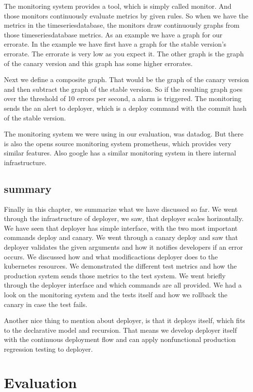 The monitoring system provides a tool, which is simply called monitor. And those monitors
continuously evaluate metrics by given rules. So when we have the metrics in the
timeseriesdatabase, the monitors draw continuously graphs from those timeseriesdatabase
metrics. As an example we have a graph for our errorate. In the example we have first have
a graph for the stable version's errorate. The errorate is very low as you expect it. The
other graph is the graph of the canary version and this graph has some higher errorates.

Next we define a composite graph. That would be the graph of the canary version and then
subtract the graph of the stable version. So if the resulting graph goes over the
threshold of 10 errors per second, a alarm is triggered. The monitoring sends the an alert
to deployer, which is a deploy command with the commit hash of the stable version.

The monitoring system we were using in our evaluation, was datadog. But there is also the
opens source monitoring system prometheus, which provides very similar features. Also
google has a similar monitoring system in there internal infrastructure.

\section{summary}
Finally in this chapter, we summarize what we have discussed so far. We went through the
infrastructure of deployer, we saw, that deployer scales horizontally. We have seen that
deployer has simple interface, with the two most important commands deploy and canary. We
went through a canary deploy and saw that deployer validates the given arguments and how
it notifies developers if an error occurs. We discussed how and what modificactions
deployer does to the kubernetes resources. We demonstrated the different test metrics and
how the production system sends those metrics to the test system. We went briefly through
the deployer interface and which commands are all provided. We had a look on the
monitoring system and the tests itself and how we rollback the canary in case the test
fails.

Another nice thing to mention about deployer, is that it deploys itself, which fits to the
declarative model and recursion. That means we develop deployer itself with the continuous
deployment flow and can apply nonfunctional production regression testing to deployer.

\chapter{Evaluation}

